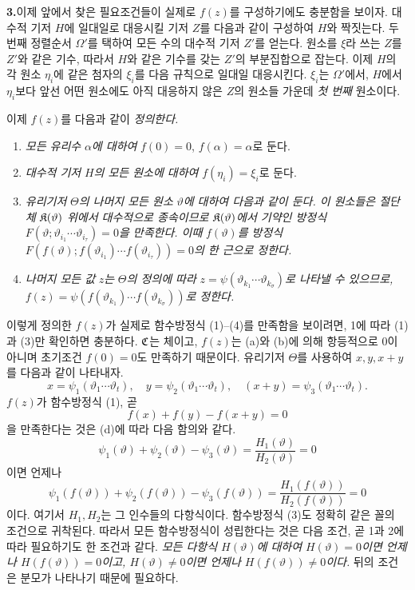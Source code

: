 \medskip
\noindent\textbf{3.}\quad 이제 앞에서 찾은 필요조건들이 실제로 \(f(z)\)를 구성하기에도 충분함을 보이자. 대수적 기저 \(H\)에 일대일로 대응시킬 기저 \(Z\)를 다음과 같이 구성하여 \(H\)와 짝짓는다. 두 번째 정렬순서 \(\Omega'\)를 택하여 모든 수의 대수적 기저 \(Z'\)를 얻는다. 원소를 \(\xi\)라 쓰는 \(Z\)를 \(Z'\)와 같은 기수, 따라서 \(H\)와 같은 기수를 갖는 \(Z'\)의 부분집합으로 잡는다. 이제 \(H\)의 각 원소 \(\eta_i\)에 같은 첨자의 \(\xi_i\)를 다음 규칙으로 일대일 대응시킨다. \(\xi_i\)는 \(\Omega'\)에서, \(H\)에서 \(\eta_i\)보다 앞선 어떤 원소에도 아직 대응하지 않은 \(Z\)의 원소들 가운데 \emph{첫 번째} 원소이다.

이제 \(f(z)\)를 다음과 같이 \emph{정의한다.}
\begin{enumerate}
\item[(a)] \emph{모든 유리수} \(\alpha\)\emph{에 대하여} \(f(0)=0\), \(f(\alpha)=\alpha\)로 둔다.
\item[(b)] \emph{대수적 기저} \(H\)\emph{의 모든 원소에 대하여} \(f(\eta_i)=\xi_i\)로 둔다.
\item[(c)] \emph{유리기저} \(\Theta\)\emph{의 나머지 모든 원소} \(\vartheta\)\emph{에 대하여 다음과 같이 둔다. 이 원소들은 절단체} \(\mathfrak K(\vartheta)\) \emph{위에서 대수적으로 종속이므로} \(\mathfrak K(\vartheta)\)\emph{에서 기약인 방정식} \(F(\vartheta;\vartheta_{i_1}\cdots\vartheta_{i_\tau})=0\)\emph{을 만족한다. 이때} \(f(\vartheta)\)\emph{를 방정식} \(F(f(\vartheta);f(\vartheta_{i_1})\cdots f(\vartheta_{i_\tau}))=0\)\emph{의 한 근으로 정한다.}
\item[(d)] \emph{나머지 모든 값} \(z\)\emph{는} \(\Theta\)\emph{의 정의에 따라} \(z=\psi(\vartheta_{k_1}\cdots\vartheta_{k_\sigma})\)\emph{로 나타낼 수 있으므로,} \(f(z)=\psi(f(\vartheta_{k_1})\cdots f(\vartheta_{k_\sigma}))\)\emph{로 정한다.}
\end{enumerate}
이렇게 정의한 \(f(z)\)가 실제로 함수방정식 (1)--(4)를 만족함을 보이려면, 1에 따라 (1)과 (3)만 확인하면 충분하다. \(\mathfrak C\)는 체이고, \(f(z)\)는 (a)와 (b)에 의해 항등적으로 0이 아니며 초기조건 \(f(0)=0\)도 만족하기 때문이다. 유리기저 \(\Theta\)를 사용하여 \(x,y,x+y\)를 다음과 같이 나타내자.
\[
x=\psi_1(\vartheta_1\cdots\vartheta_t),\quad
y=\psi_2(\vartheta_1\cdots\vartheta_t),\quad
(x+y)=\psi_3(\vartheta_1\cdots\vartheta_t).
\]
\(f(z)\)가 함수방정식 (1), 곧
\[
f(x)+f(y)-f(x+y)=0
\]
을 만족한다는 것은 (d)에 따라 다음 함의와 같다.
\[
\psi_1(\vartheta)+\psi_2(\vartheta)-\psi_3(\vartheta)
=\frac{H_1(\vartheta)}{H_2(\vartheta)}=0
\]
이면 언제나
\[
\psi_1(f(\vartheta))+\psi_2(f(\vartheta))-\psi_3(f(\vartheta))
=\frac{H_1(f(\vartheta))}{H_2(f(\vartheta))}=0
\]
이다. 여기서 \(H_1,H_2\)는 그 인수들의 다항식이다. 함수방정식 (3)도 정확히 같은 꼴의 조건으로 귀착된다. 따라서 모든 함수방정식이 성립한다는 것은 다음 조건, 곧 1과 2에 따라 필요하기도 한 조건과 같다. \emph{모든 다항식 \(H(\vartheta)\)에 대하여 \(H(\vartheta)=0\)이면 언제나 \(H(f(\vartheta))=0\)이고, \(H(\vartheta)\ne0\)이면 언제나 \(H(f(\vartheta))\ne0\)이다.} 뒤의 조건은 분모가 나타나기 때문에 필요하다.

